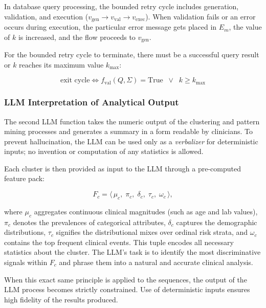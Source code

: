 In database query processing, the bounded retry cycle includes generation, validation, and execution ($v_{\mathrm{gen}} \to v_{\mathrm{val}} \to v_{\mathrm{exec}}$). When validation fails or an error occurs during execution, the particular error message gets placed in $E_m$, the value of $k$ is increased, and the flow proceeds to $v_{\mathrm{gen}}$.

For the bounded retry cycle to terminate, there must be a successful query result or $k$ reaches its maximum value $k_{\max}$:

\begin{equation}
    \text{exit cycle} \iff f_{\mathrm{val}}(Q,\Sigma) = \mathrm{True} \;\;\lor\;\; k \ge k_{\max}
    \label{eq:exit}
\end{equation}

\subsubsection*{LLM Interpretation of Analytical Output}

The second LLM function takes the numeric output of the clustering and pattern mining processes and generates a summary in a form readable by clinicians. To prevent hallucination, the LLM can be used only as a \emph{verbalizer} for deterministic inputs; no invention or computation of any statistics is allowed.

Each cluster is then provided as input to the LLM through a pre-computed feature pack:

\begin{equation}
    F_c = \langle\, \mu_c,\; \pi_c,\; \delta_c,\; \tau_c,\; \omega_c \,\rangle,
    \label{eq:feature_pack}
\end{equation}

where $\mu_c$ aggregates continuous clinical magnitudes (such as age and lab values), $\pi_c$ denotes the prevalences of categorical attributes, $\delta_c$ captures the demographic distributions, $\tau_c$ signifies the distributional mixes over ordinal risk strata, and $\omega_c$ contains the top frequent clinical events. This tuple encodes all necessary statistics about the cluster. The LLM's task is to identify the most discriminative signals within $F_c$ and phrase them into a natural and accurate clinical analysis.

When this exact same principle is applied to the sequences, the output of the LLM process becomes strictly constrained. Use of deterministic inputs ensures high fidelity of the results produced.
